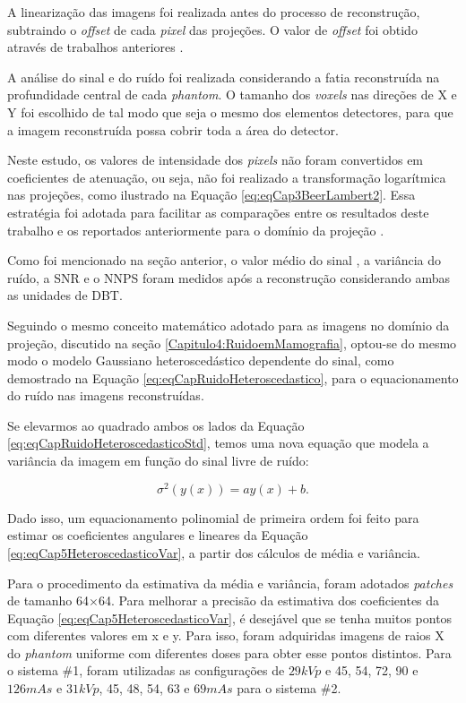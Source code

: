 A linearização das imagens foi realizada antes do processo de reconstrução, subtraindo o \textit{offset} de cada \textit{pixel} das projeções. O valor de \textit{offset} foi obtido através de trabalhos anteriores \cite{young2008technical,borges2017pipeline, borges2017method}.

A análise do sinal e do ruído foi realizada considerando a fatia reconstruída na profundidade central de cada \textit{phantom}. O tamanho dos \textit{voxels} nas direções de X e Y foi escolhido de tal modo que seja o mesmo dos elementos detectores, para que a imagem reconstruída possa cobrir toda a área do detector. 

Neste estudo, os valores de intensidade dos \textit{pixels} não foram convertidos em coeficientes de atenuação, ou seja, não foi realizado a transformação logarítmica nas projeções, como ilustrado na Equação \ref{eq:eqCap3BeerLambert2}. Essa estratégia foi adotada para facilitar as comparações entre os resultados deste trabalho e os reportados anteriormente para o domínio da projeção \cite{borges2017pipeline,borges2017method, borges2018restoration,brito2018application,guerrero2018}.

Como foi mencionado na seção anterior, o valor médio do sinal , a variância do ruído, a \acs{SNR} e o \acs{NNPS} foram medidos após a reconstrução considerando ambas as unidades de \acs{DBT}. 

Seguindo o mesmo conceito matemático adotado para as imagens no domínio da projeção, discutido na seção \ref{Capitulo4:RuidoemMamografia}, optou-se do mesmo modo o modelo Gaussiano heteroscedástico dependente do sinal, como demostrado na Equação \ref{eq:eqCapRuidoHeteroscedastico}, para o equacionamento  do ruído nas imagens reconstruídas. 

Se elevarmos ao quadrado ambos os lados da Equação \ref{eq:eqCapRuidoHeteroscedasticoStd}, temos uma nova equação que modela a variância da imagem em função do sinal livre de ruído:

\begin{equation}
\sigma^{2}(y(x)) = ay(x)+b.
\label{eq:eqCap5HeteroscedasticoVar}
\end{equation} 

Dado isso, um equacionamento polinomial de primeira ordem foi feito para estimar os coeficientes angulares e lineares da Equação \ref{eq:eqCap5HeteroscedasticoVar}, a partir dos cálculos de média e variância.

Para o procedimento da estimativa da média e variância, foram adotados \textit{patches} de tamanho 64$\times$64. Para melhorar a precisão da estimativa dos coeficientes da Equação \ref{eq:eqCap5HeteroscedasticoVar}, é desejável que se tenha muitos pontos com diferentes valores em x e y. Para isso, foram adquiridas imagens de raios X do \textit{phantom} uniforme com diferentes doses para obter esse pontos distintos. Para o sistema \#1, foram utilizadas as configurações de $29kVp$ e 45, 54, 72, 90 e $126mAs$ e $31kVp$, 45, 48, 54, 63 e $69mAs$ para o sistema \#2.


